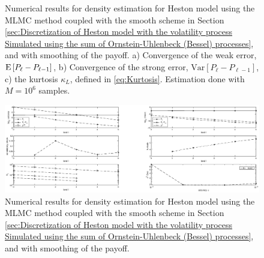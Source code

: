 \begin{figure}[htb]
\begin{subfigure}{0.5\textwidth}
		\caption{}
		\label{fig:hest_density_kurt}
	\end{subfigure}
	\caption{Numerical results for  density estimation  for Heston model using the MLMC method coupled with  the smooth   scheme in Section \ref{sec:Discretization of Heston model with the volatility process Simulated using the sum of  Ornstein-Uhlenbeck (Bessel) processes}, and with smoothing of the payoff. a) Convergence of  the weak error, $\mathrm{E}\left[P_{\ell}-P_{\ell-1}\right]$, b) Convergence of  the strong error, $\text{Var}\left[P_{\ell}-P_{\ell-1}\right]$, c) the kurtosis $\kappa_{L}$, defined in \eqref{eq:Kurtosis}.  Estimation done with $M=10^6$ samples.}
	\label{fig:outputs_heston_density_OU}	
\end{figure}
\FloatBarrier

	\begin{figure}[h!]
\centering
\includegraphics[width=1.2\linewidth]{./figures/MLMC_density_Heston_estimation/OU/digital_option_set1_L_0_8_steps_L_5.eps}

\caption{Numerical results for  density estimation  for Heston model using the MLMC method coupled with  the smooth   scheme in Section \ref{sec:Discretization of Heston model with the volatility process Simulated using the sum of  Ornstein-Uhlenbeck (Bessel) processes}, and with smoothing of the payoff.}
\label{fig:Heston_density_MLMC_with_smoothing_OU}
\end{figure}


\FloatBarrier

